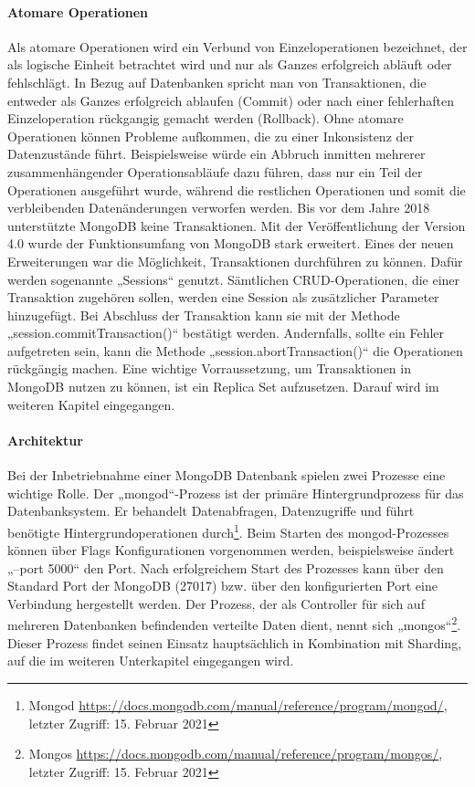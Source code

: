 \paragraph{Atomare Operationen}
Als atomare Operationen wird ein Verbund von Einzeloperationen bezeichnet, der als logische Einheit betrachtet wird und nur als Ganzes erfolgreich abläuft oder fehlschlägt. In Bezug auf Datenbanken spricht man von Transaktionen, die entweder als Ganzes erfolgreich ablaufen (Commit) oder nach einer fehlerhaften Einzeloperation rückgangig gemacht werden (Rollback). Ohne atomare Operationen können Probleme aufkommen, die zu einer Inkonsistenz der Datenzustände führt. Beispielsweise würde ein Abbruch inmitten mehrerer zusammenhängender Operationsabläufe dazu führen,  dass nur ein Teil der Operationen ausgeführt wurde, während die restlichen Operationen und somit die verbleibenden Datenänderungen verworfen werden.
\newline
Bis vor dem Jahre 2018 unterstützte MongoDB keine Transaktionen. Mit der Veröffentlichung der Version 4.0 wurde der Funktionsumfang von MongoDB stark erweitert. Eines der neuen Erweiterungen war die Möglichkeit, Transaktionen durchführen zu können. Dafür werden sogenannte „Sessions“ genutzt. Sämtlichen CRUD-Operationen, die einer Transaktion zugehören sollen, werden eine Session als zusätzlicher Parameter hinzugefügt.  Bei Abschluss der Transaktion kann sie mit der Methode „session.commitTransaction()“ bestätigt werden. Andernfalls, sollte ein Fehler aufgetreten sein, kann die Methode „session.abortTransaction()“ die Operationen rückgängig machen. Eine wichtige Vorraussetzung, um Transaktionen in MongoDB nutzen zu können, ist ein Replica Set aufzusetzen. Darauf wird im weiteren Kapitel eingegangen. 
\newline


\paragraph{Architektur}
Bei der Inbetriebnahme einer MongoDB Datenbank spielen zwei Prozesse eine wichtige  Rolle. \newline Der  „mongod“-Prozess ist der primäre Hintergrundprozess für das Datenbanksystem. Er behandelt Datenabfragen, Datenzugriffe und führt benötigte Hintergrundoperationen durch\footnote{Mongod \url{https://docs.mongodb.com/manual/reference/program/mongod/}, letzter Zugriff: 15. Februar 2021}. Beim Starten des mongod-Prozesses können über Flags Konfigurationen vorgenommen werden, beispielsweise ändert „--port 5000“ den Port. Nach erfolgreichem Start des Prozesses kann über den Standard Port der MongoDB (27017) bzw. über den konfigurierten Port eine Verbindung hergestellt werden.\newline
Der Prozess, der als Controller für sich auf mehreren Datenbanken befindenden verteilte Daten dient, nennt sich „mongos“\footnote{Mongos \url{https://docs.mongodb.com/manual/reference/program/mongos/}, letzter Zugriff: 15. Februar 2021}. Dieser Prozess findet seinen Einsatz hauptsächlich in Kombination mit Sharding, auf die im weiteren Unterkapitel eingegangen wird. \newline

